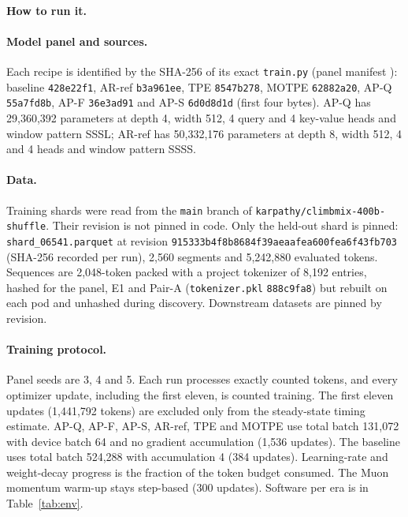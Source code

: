 \documentclass{article}
\begin{document}
\paragraph{How to run it.}\label{app:howto} 

\paragraph{Model panel and sources.} Each recipe is identified by the SHA-256 of its exact \texttt{train.py} (panel manifest ): baseline \texttt{428e22f1}, AR-ref \texttt{b3a961ee}, TPE \texttt{8547b278}, MOTPE \texttt{62882a20}, AP-Q \texttt{55a7fd8b}, AP-F \texttt{36e3ad91} and AP-S \texttt{6d0d8d1d} (first four bytes). AP-Q has 29,360,392 parameters at depth 4, width 512, 4 query and 4 key-value heads and window pattern SSSL; AR-ref has 50,332,176 parameters at depth 8, width 512, 4 and 4 heads and window pattern SSSS.

\paragraph{Data.} Training shards were read from the \texttt{main} branch of \texttt{karpathy/climbmix-400b-shuffle}. Their revision is not pinned in code. Only the held-out shard is pinned: \texttt{shard\_06541.parquet} at revision \texttt{915333b4f8b8684f39aeaafea600fea6f43fb703} (SHA-256 recorded per run), 2,560 segments and 5,242,880 evaluated tokens. Sequences are 2,048-token packed with a project tokenizer of 8,192 entries, hashed for the panel, E1 and Pair-A (\texttt{tokenizer.pkl} \texttt{888c9fa8}) but rebuilt on each pod and unhashed during discovery. Downstream datasets are pinned by revision.

\paragraph{Training protocol.} Panel seeds are 3, 4 and 5. Each run processes exactly \CRPanelBudget{} counted tokens, and every optimizer update, including the first eleven, is counted training. The first eleven updates (1,441,792 tokens) are excluded only from the steady-state timing estimate. AP-Q, AP-F, AP-S, AR-ref, TPE and MOTPE use total batch 131,072 with device batch 64 and no gradient accumulation (1,536 updates). The baseline uses total batch 524,288 with accumulation 4 (384 updates). Learning-rate and weight-decay progress is the fraction of the token budget consumed. The Muon \citep{jordan2024muon} momentum warm-up stays step-based (300 updates). Software per era is in Table~\ref{tab:env}.
\end{document}
